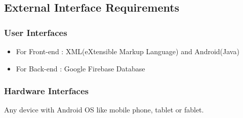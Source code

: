 \documentclass{report}
\begin{document}
\subsection{External Interface Requirements}
\subsubsection{User Interfaces}

\begin{itemize}
\renewcommand{\labelitemi}{$\rightarrow$}
\item For Front-end : XML(eXtensible Markup Language) and Android(Java)
\item For Back-end : Google Firebase Database            
\end{itemize}

\subsubsection{Hardware Interfaces}
Any device with Android OS like mobile phone, tablet or fablet.
\end{document}
